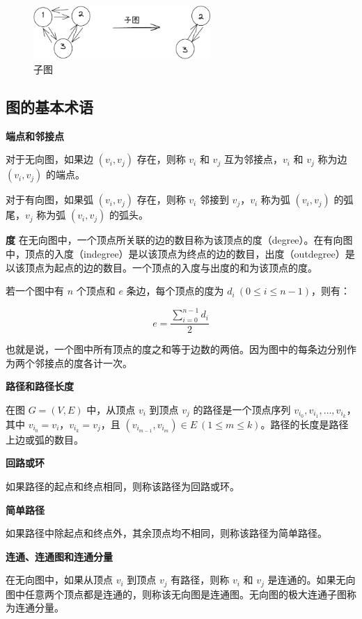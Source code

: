 \documentclass[lang=cn,newtx,10pt,scheme=chinese]{../elegantbook}
\begin{document}
\begin{figure}[h!]
  \centering
  \includegraphics[width=0.6\textwidth]{./figure/pdf/cropped/subGraph.pdf}
  \caption{子图}
  \label{fig:subGraph}
\end{figure}

      


\subsection{图的基本术语}


\textbf{端点和邻接点}

对于无向图，如果边 $(v_i, v_j)$ 存在，则称 $v_i$ 和 $v_j$ 互为邻接点，$v_i$ 和 $v_j$ 称为边 $(v_i, v_j)$ 的端点。

对于有向图，如果弧 $(v_i, v_j)$ 存在，则称 $v_i$ 邻接到 $v_j$，$v_i$ 称为弧 $(v_i, v_j)$ 的弧尾，$v_j$ 称为弧 $(v_i, v_j)$ 的弧头。

\textbf{度}
在无向图中，一个顶点所关联的边的数目称为该顶点的度（degree）。在有向图中，顶点的入度（indegree）是以该顶点为终点的边的数目，出度（outdegree）是以该顶点为起点的边的数目。一个顶点的入度与出度的和为该顶点的度。

若一个图中有 $n$ 个顶点和 $e$ 条边，每个顶点的度为 $d_i \ (0 \leq i \leq n-1)$，则有：

\[
e = \frac{\sum_{i=0}^{n-1} d_i}{2}
\]

也就是说，一个图中所有顶点的度之和等于边数的两倍。因为图中的每条边分别作为两个邻接点的度各计一次。

\textbf{路径和路径长度}

在图 $G = (V, E)$ 中，从顶点 $v_i$ 到顶点 $v_j$ 的路径是一个顶点序列 $v_{i_0}, v_{i_1}, \dots, v_{i_k}$，其中 $v_{i_0} = v_i$，$v_{i_k} = v_j$，且 $(v_{i_{m-1}}, v_{i_m}) \in E \ (1 \leq m \leq k)$。路径的长度是路径上边或弧的数目。

\textbf{回路或环}

如果路径的起点和终点相同，则称该路径为回路或环。

\textbf{简单路径}

如果路径中除起点和终点外，其余顶点均不相同，则称该路径为简单路径。

\textbf{连通、连通图和连通分量}

在无向图中，如果从顶点 $v_i$ 到顶点 $v_j$ 有路径，则称 $v_i$ 和 $v_j$ 是连通的。如果无向图中任意两个顶点都是连通的，则称该无向图是连通图。无向图的极大连通子图称为连通分量。
\end{document}
